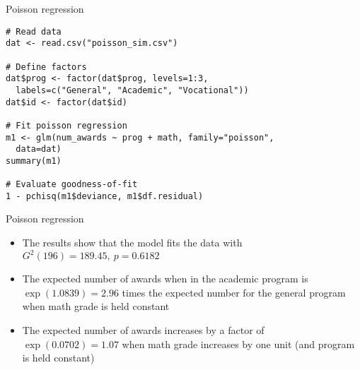 \documentclass{beamer}
\begin{document}
{

\begin{frame}[fragile]{Poisson regression}
  \begin{lstlisting}
# Read data
dat <- read.csv("poisson_sim.csv")

# Define factors
dat$prog <- factor(dat$prog, levels=1:3,
  labels=c("General", "Academic", "Vocational"))
dat$id <- factor(dat$id)

# Fit poisson regression
m1 <- glm(num_awards ~ prog + math, family="poisson",
  data=dat)
summary(m1)

# Evaluate goodness-of-fit
1 - pchisq(m1$deviance, m1$df.residual)
\end{lstlisting}
\end{frame}

% 
% 

}


\begin{frame}{Poisson regression}
\begin{itemize}
  \item The results show that the model fits the data with $G^2(196) =
    189.45,~p=0.6182$
  \item The expected number of awards when in the academic program is
    $\exp(1.0839) = 2.96$ times the expected number for the general program
    when math grade is held constant
  \item The expected number of awards increases by a factor of
    $\exp(0.0702) = 1.07$ when math grade increases by one unit (and
    program is held constant)
\end{itemize}
\end{frame}
\end{document}
